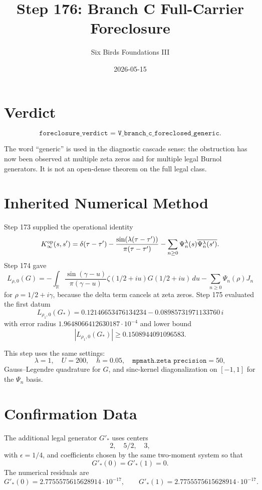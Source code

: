 \documentclass[11pt]{article}
\title{Step 176: Branch C Full-Carrier Foreclosure}
\author{Six Birds Foundations III}
\date{2026-05-15}
\begin{document}
\maketitle

\section{Verdict}

\[
\boxed{\texttt{foreclosure\_verdict = V\_branch\_c\_foreclosed\_generic}.}
\]

The word ``generic'' is used in the diagnostic cascade sense: the obstruction
has now been observed at multiple zeta zeros and for multiple legal Burnol
generators.  It is not an open-dense theorem on the full legal class.

\section{Inherited Numerical Method}

Step 173 supplied the operational identity
\[
K_\infty^{\rm op}(s,s')
=\delta(\tau-\tau')
-\frac{\sin(\lambda(\tau-\tau'))}{\pi(\tau-\tau')}
-\sum_{n\ge0}\Psi_n^\lambda(s)\overline{\Psi_n^\lambda(s')}.
\]
Step 174 gave
\[
L_{\rho,0}(G)
=-\int_{\mathbb R}
\frac{\sin(\gamma-u)}{\pi(\gamma-u)}
\zeta(1/2+iu)G(1/2+iu)\,du
-\sum_{n\ge0}\Psi_n(\rho)J_n
\]
for \(\rho=1/2+i\gamma\), because the delta term cancels at zeta zeros.
Step 175 evaluated the first datum
\[
L_{\rho_1,0}(G_*)
=0.12146653476134234-0.08985731971133760\,i
\]
with error radius \(1.9648066412630187\cdot10^{-4}\) and lower bound
\[
|L_{\rho_1,0}(G_*)|\ge0.1508944091096583.
\]

This step uses the same settings:
\[
\lambda=1,\quad U=200,\quad h=0.05,\quad \texttt{mpmath.zeta precision}=50,
\]
Gauss--Legendre quadrature for \(G\), and sinc-kernel diagonalization on
\([-1,1]\) for the \(\Psi_n\) basis.

\section{Confirmation Data}

The additional legal generator \(G'_*\) uses centers
\[
2,\quad 5/2,\quad 3,
\]
with \(\epsilon=1/4\), and coefficients chosen by the same two-moment system
so that
\[
G'_*(0)=G'_*(1)=0.
\]
The numerical residuals are
\[
G'_*(0)=2.7755575615628914\cdot10^{-17},
\qquad
G'_*(1)=2.7755575615628914\cdot10^{-17}.
\]
\end{document}
